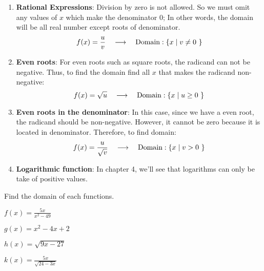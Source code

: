 \begin{enumerate}[label=\protect\circled{\arabic*}]
    \item \textbf{Rational Expressions}: Division by zero is not allowed. So we must omit any values of $x$ which make the denominator 0; In other words, the domain will be all real number except roots of denominator.
            \begin{equation*}
               f(x) =\frac{u}{v}\quad \longrightarrow \quad 
               \text{Domain}: \{x \mid v\neq 0\ \}\\
        \end{equation*}
    \item \textbf{Even roots}: For even roots such as square roots, the radicand can not be negative. Thus, to find the domain find all $x$ that makes the radicand non-negative: 
        \begin{equation*}
                f(x) =\sqrt{u} \quad \longrightarrow \quad 
               \text{Domain}: \{x \mid u \ge 0\ \}\\
        \end{equation*}
    \item \textbf{Even roots in the denominator}: In this case, since we have a even root, the radicand should be non-negative. However, it cannot be zero because it is located in denominator. Therefore, to find domain:
            \begin{equation*}
                f(x) =\frac{u}{\sqrt{v}} \quad \longrightarrow \quad 
               \text{Domain}: \{x \mid v > 0\ \}\\
        \end{equation*}
    \item \textbf{Logarithmic function}: In chapter 4, we'll see that logarithms can only be take of positive values.
\end{enumerate}
\begin{exa}
    Find the domain of each functions.
    \begin{enumerate}[\bfseries a.]
        \begin{multicols}{2}
        \item $f(x) = \frac{5x}{x^2-49}$
        \item $g(x) =x^2-4x+2$
        \item $ h(x) = \sqrt{9x-27}$
        \item $k(x)=\frac{5x}{\sqrt{24-3x}}$
        \end{multicols}
    \end{enumerate}
\end{exa}
